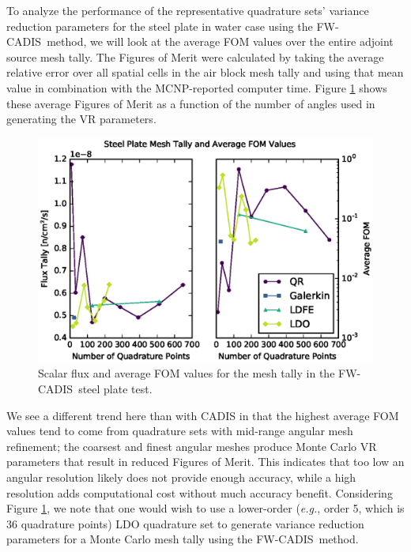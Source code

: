 \documentclass{article} %
\newcommand{\fwc}{\mbox{FW-CADIS}}
\begin{document}
To analyze the performance of the representative quadrature sets' variance
reduction parameters for the steel plate in water case using the \fwc\ method,
we will look at the average FOM values over the entire adjoint source mesh
tally. The Figures of Merit were calculated by taking the average relative
error over all spatial cells in the air block mesh tally and using that mean
value in combination with the MCNP-reported computer time. Figure 
\ref{steel-fwc} shows these average Figures of Merit as a function of the
number of angles used in generating the VR parameters.

\begin{figure}[!htb]
\centering
\includegraphics[max height=0.445\textheight]{steel-fwcadis.eps}
\caption{Scalar flux and average FOM values for the mesh tally in the \fwc\
         steel plate test.}
\label{steel-fwc}
\end{figure}

We see a different trend here than with CADIS in that the highest average FOM
values tend to come from quadrature sets with mid-range angular mesh
refinement; the coarsest and finest angular meshes produce Monte Carlo VR
parameters that result in reduced Figures of Merit. This indicates that too
low an angular resolution likely does not provide enough accuracy, while a
high resolution adds computational cost without much accuracy benefit.
Considering Figure \ref{steel-fwc}, we note
that one would wish to use a lower-order (\textit{e.g.}, order 5, which is 36
quadrature points) LDO quadrature set to generate variance reduction
parameters for a Monte Carlo mesh tally using the \fwc\ method.

\FloatBarrier
\end{document}
